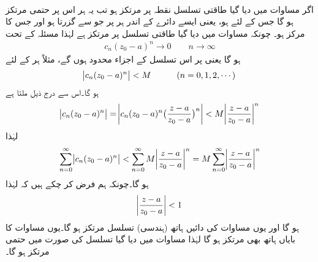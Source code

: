 \quad {}\\
اگر مساوات  میں دیا گیا طاقتی تسلسل نقطہ  پر مرتکز ہو تب یہ ہر اس  پر حتمی مرتکز ہو گا جس کے لئے
  ہو، یعنی ایسے دائرے کے اندر ہر  پر جو  سے گزرتا ہو اور جس کا مرکز  ہو۔
چونکہ مساوات  میں دیا گیا طاقتی تسلسل  پر مرتکز ہے لہٰذا مسئلہ  کے تحت
\begin{align*}
c_n(z_0-a)^n\to 0 \quad \quad n\to \infty
\end{align*}
ہو گا یعنی  پر اس تسلسل کے اجزاء محدود ہوں گے، مثلاً ہر  کے لئے
\begin{align*}
\abs{c_n(z_0-a)^n}<M\quad \quad \quad (n=0,1,2,\cdots)
\end{align*}
ہو گا۔اس سے  درج ذیل ملتا ہے
\begin{align*}
\abs{c_n(z_0-a)^n}=\abs{c_n(z_0-a)^n\big(\frac{z-a}{z_0-a}\big)^n}<M\abs{\frac{z-a}{z_0-a}}^n
\end{align*}
لہٰذا 
\begin{align}\label{مساوات_ٹیلر_ثبوت_طاقتی_تسلسل_مرکوزیت}
\sum\limits_{n=0}^{\infty}\abs{c_n(z_0-a)^n}<\sum\limits_{n=0}^{\infty}M\abs{\frac{z-a}{z_0-a}}^n=M\sum\limits_{n=0}^{\infty}\abs{\frac{z-a}{z_0-a}}^n
\end{align}
ہو گا۔چونکہ ہم فرض کر چکے ہیں کہ  لہٰذا
\begin{align*}
\abs{\frac{z-a}{z_0-a}}<1
\end{align*}
ہو گا اور یوں  مساوات  کی دائیں ہاتھ  (ہندسی) تسلسل مرتکز ہو گا۔یوں  مساوات  کا بایاں ہاتھ بھی مرتکز ہو گا لہٰذا مساوات  میں دیا گیا تسلسل  کی صورت میں حتمی مرتکز ہو گا۔

